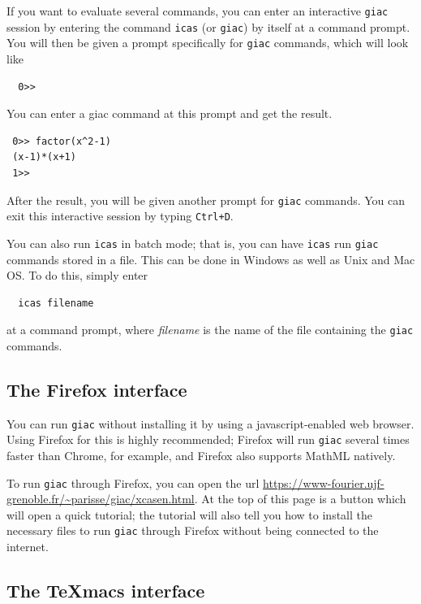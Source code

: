 \documentclass[a4paper,11pt]{book}
\begin{document}
If you want to evaluate several commands, you can enter an interactive
\texttt{giac} session by entering the command
\texttt{icas} (or \texttt{giac}) by itself at a command prompt.  You
will then be given a prompt specifically for \texttt{giac} commands,
which will look like
\begin{verbatim}
  0>>
\end{verbatim}
You can enter a giac command at this prompt and get the result.
\begin{verbatim}
 0>> factor(x^2-1)
 (x-1)*(x+1)
 1>>
\end{verbatim}
After the result, you will be given another prompt for \texttt{giac}
commands.  You can exit this interactive session by typing
\texttt{Ctrl+D}.

You can also run \texttt{icas} in batch mode; that is, 
you can have \texttt{icas} run \texttt{giac} commands stored in a
file.  This can be done in Windows as well as Unix and Mac OS.
To do this, simply enter 
\begin{verbatim}
  icas filename
\end{verbatim}
at a command prompt, where \textit{filename} is the name of the file
containing the \texttt{giac} commands.

\subsection{The Firefox interface}

You can run \texttt{giac} without installing it by using a
javascript-enabled web browser.  Using Firefox for this is highly
recommended; Firefox will run \texttt{giac} several times faster than
Chrome, for example, and Firefox also supports MathML natively.


To run \texttt{giac} through Firefox, you can open the url
\url{https://www-fourier.ujf-grenoble.fr/~parisse/giac/xcasen.html}.
At the top of this page is a button which will open a quick tutorial;
the tutorial will also tell you how to install the necessary files to
run \texttt{giac} through Firefox without being connected to the
internet.

\subsection{The TeXmacs interface}
\end{document}
